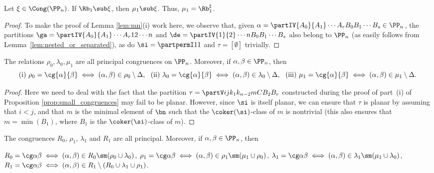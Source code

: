 \begin{lemma}
\label{lem:mn:PPn}
Let $\xi\in\Cong(\PP_n)$.
If $\Rb_1\sub\xi$, then $\mu_1\sub\xi$.  Thus, $\mu_1=\Rb_1^\sharp$.
\end{lemma}

\begin{proof}
To make the proof of Lemma \ref{lem:mn}(i) work here, we observe that, given
${\alpha=\partIV{A_0}{A_1}\cdots{A_r}{B_0}{B_1}\cdots{B_s}\in\PP_n}$,
the partitions
$\ga=\partIV{A_0}{A_1}\cdots{A_r}{1}{2}\cdots{n}$ and $\de=\partIV{1}{2}\cdots{n}{B_0}{B_1}\cdots{B_s}$ also belong to $\PP_n$ (as easily follows from Lemma~\ref{lem:nested_or_separated}),
as do
$\si=\partpermI11$ and $\tau=[\emptyset]$ trivially.
\end{proof}

\begin{proposition}
\label{prop:small_congruences:PPn}
The relations $\rho_0,\lambda_0,\mu_1$ are all principal congruences on $\PP_n$.  Moreover, if $\alpha,\beta\in\PP_n$, then
\[
\textup{(i)}\
\rho_0=\cg{\alpha}{\beta}\iff (\alpha,\beta)\in\rho_0\setminus\Delta,\ \
\textup{(ii)}\ \lambda_0=\cg{\alpha}{\beta}\iff (\alpha,\beta)\in\lambda_0\setminus\Delta,\ \
\textup{(iii)}\ \mu_1=\cg{\alpha}{\beta}\iff (\alpha,\beta)\in\mu_1\setminus\Delta.
\]
\end{proposition}

\begin{proof}
Here we need to deal with the fact that the partition $\tau=\partV ij{k_1}{k_{n-2}}{m}{C}{B_2}{B_r}$ constructed during the proof of part~(i)
of Proposition \ref{prop:small_congruences}
may fail to be planar.  However, since $\si$ is itself planar, we can ensure that $\tau$ is planar by assuming that $i<j$, and that $m$ is the minimal element of $\bn$ such that the $\coker(\si)$-class of $m$ is nontrivial (this also ensures that $m=\min(B_1)$, where $B_1$ is the $\coker(\si)$-class of $m$).  \end{proof}


%
\begin{proposition}
\label{prop:joins2:PPn}
The congruences $R_0$, $\rho_1$, $\lambda_1$ and $R_1$ are all principal.  Moreover, if $\alpha,\beta\in\PP_n$, then
\begin{itemize}\begin{multicols}{2}
\itemit{i} $R_0=\cg\alpha\beta\iff (\alpha,\beta)\in R_0 \sm(\rho_0\cup\lambda_0)$,
\itemit{ii} $\rho_1=\cg\alpha\beta\iff (\alpha,\beta)\in\rho_1\sm(\mu_1\cup\rho_0)$,
\itemit{iii} $\lambda_1=\cg\alpha\beta\iff (\alpha,\beta)\in\lambda_1\sm(\mu_1\cup\lambda_0)$,
\itemit{iv} $R_1=\cg\alpha\beta\iff (\alpha,\beta)\in R_1\setminus ( R_0 \cup \lambda_1 \cup \rho_1 )$.
\end{multicols}
\end{itemize}
\end{proposition}

